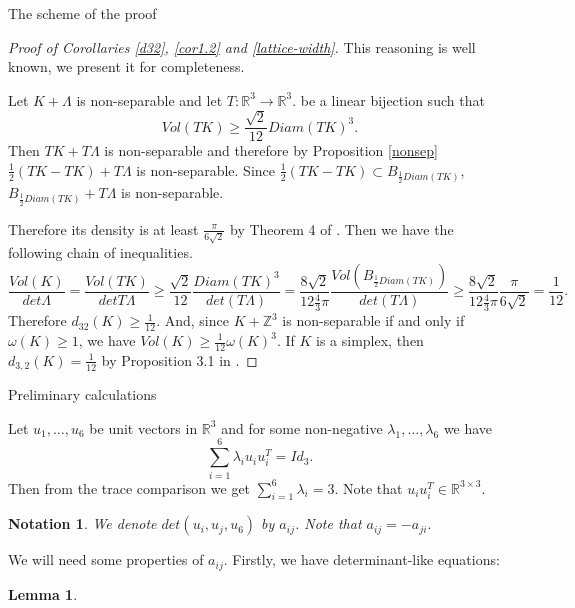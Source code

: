 \documentclass[12pt]{article}
\newtheorem{lemma}{Lemma}[section]
\newtheorem{notation}{Notation}[section]
\begin{document}
\begin{section}{The scheme of the proof}
    \begin{proof}[Proof of Corollaries \ref{d32}, \ref{cor1.2} and \ref{lattice-width}]
        This reasoning is well known, we present it for completeness. 

        
        Let $K + \Lambda$ is non-separable and let $T:\mathbb{R}^3\to \mathbb{R}^3.$ be a linear bijection such that $$Vol(TK)\geq \frac{\sqrt{2}}{12}Diam(TK)^3.$$
        Then $TK + T\Lambda$ is non-separable and therefore by Proposition \ref{nonsep} $\frac{1}{2}(TK-TK) + T\Lambda$ is non-separable. Since $\frac{1}{2}(TK-TK)\subset B_{\frac{1}{2}Diam(TK)}$, $B_{\frac{1}{2}Diam(TK)} + T\Lambda$ is non-separable.
        
        Therefore its density is at least $\frac{\pi}{6\sqrt{2}}$ by Theorem 4 of \cite{makai1978}. Then we have the following chain of inequalities.
        $$
            \frac{Vol(K)}{det \Lambda} = \frac{Vol(TK)}{det T\Lambda} \geq \frac{\sqrt{2}}{12}\frac{Diam(TK)^3}{det (T\Lambda)} = \frac{8\sqrt{2}}{12\frac{4}{3}\pi}\frac{Vol(B_{\frac{1}{2}Diam(TK)})}{det (T\Lambda)} \geq \frac{8\sqrt{2}}{12\frac{4}{3}\pi}\frac{\pi}{6\sqrt{2}} = \frac{1}{12}.
        $$
        Therefore $d_{32}(K)\geq \frac{1}{12}.$ And, since $K+\mathbb{Z}^3$ is non-separable if and only if $\omega(K)\geq 1$, we have  $Vol(K)\geq \frac{1}{12}\omega(K)^3.$  If $K$ is a simplex, then  $d_{3,2}(K) = \frac{1}{12}$ by Proposition 3.1 in \cite{makai2016}.
        
    \end{proof}



\begin{section}{Preliminary calculations}

    Let $u_{1},\ldots,u_{6}$ be unit vectors in $\mathbb{R}^{3}$ and for some non-negative 
    $\lambda_{1},\ldots,\lambda_{6}$ we have 
    $$
        \sum_{i=1}^{6}\lambda_{i}u_{i}u_{i}^{T} = Id_{3}.
    $$    
Then from the trace comparison we get $\sum_{i=1}^{6} \lambda_{i} = 3.$ Note that $u_{i}u_{i}^{T}\in \mathbb{R}^{3\times 3}.$
    
    \begin{notation}
        We denote $det(u_{i},u_{j},u_{6})$ by $a_{ij}$. Note that $a_{ij} = -a_{ji}.$
    \end{notation}

    We will need some properties of $a_{ij}$. Firstly, we have determinant-like equations:
    
    \begin{lemma}
    \label{det-like}
        

\end{lemma}
\end{section}
\end{section}
\end{document}
